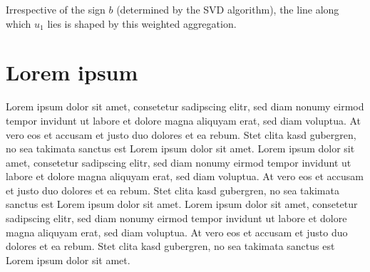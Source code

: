 Irrespective of the sign $b$ (determined by the SVD algorithm), the line along
which $u_1$ lies is shaped by this weighted aggregation.

\section{Lorem ipsum}

Lorem ipsum dolor sit amet, consetetur sadipscing elitr, sed diam
nonumy eirmod tempor invidunt ut labore et dolore magna aliquyam erat,
sed diam voluptua. At vero eos et accusam et justo duo dolores et ea
rebum. Stet clita kasd gubergren, no sea takimata sanctus est Lorem
ipsum dolor sit amet. Lorem ipsum dolor sit amet, consetetur
sadipscing elitr, sed diam nonumy eirmod tempor invidunt ut labore et
dolore magna aliquyam erat, sed diam voluptua. At vero eos et accusam
et justo duo dolores et ea rebum. Stet clita kasd gubergren, no sea
takimata sanctus est Lorem ipsum dolor sit amet. Lorem ipsum dolor sit
amet, consetetur sadipscing elitr, sed diam nonumy eirmod tempor
invidunt ut labore et dolore magna aliquyam erat, sed diam voluptua.
At vero eos et accusam et justo duo dolores et ea rebum. Stet clita
kasd gubergren, no sea takimata sanctus est Lorem ipsum dolor sit
amet.

